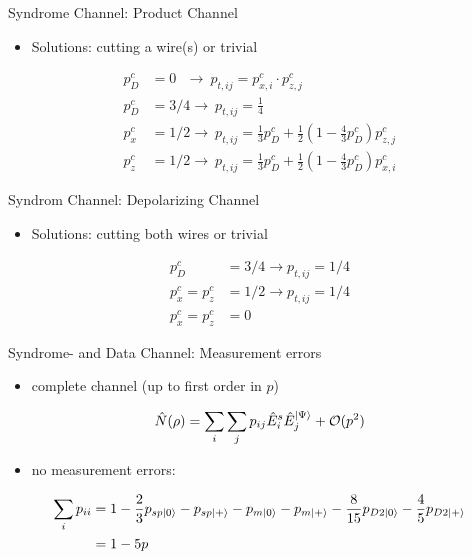 \documentclass{beamer}
\begin{document}
\begin{frame}{Syndrome Channel: Product Channel}

\begin{itemize}
    \item Solutions: cutting a wire(s) or trivial
\end{itemize}
\begin{align*}
    p_D^c &= 0 \ \ \ \rightarrow  \  p_{t,ij} =  p_{x,i}^c \cdot p_{z,j}^c\\
    p_D^c &= 3/4 \rightarrow\   p_{t,ij} = \frac{1}{4} \\
    p_x^c &= 1/2 \rightarrow \  p_{t,ij} =  \frac{1}{3}p_D^c + \frac{1}{2}\left(1-\frac{4}{3}p_D^c\right)p_{z,j}^c\\
    p_z^c &= 1/2 \rightarrow \  p_{t,ij} =  \frac{1}{3}p_D^c + \frac{1}{2}\left(1-\frac{4}{3}p_D^c\right)p_{x,i}^c
\end{align*}

\end{frame}

\begin{frame}{Syndrom Channel: Depolarizing  Channel}
\begin{itemize}
    \item Solutions: cutting both wires or trivial
\end{itemize}
\begin{align*}
    p_D^c &= 3/4 \rightarrow p_{t,ij} = 1/4\\
    p_x^c = p_z^c &= 1/2\rightarrow p_{t,ij} = 1/4\\
    p_x^c = p_z^c &= 0 
\end{align*}

\end{frame}

\begin{frame}{Syndrome- and Data Channel: Measurement errors}
    \begin{itemize}
        \item complete channel (up to first order in $p$)
    \end{itemize}

    \begin{equation*}
         \hat{N}(\rho) = \sum_i \sum_j p_{ij} \hat{E}_i^{s} \hat{E}_j^{\ket{\Psi}} + \mathcal{O}(p^2)
    \end{equation*}
    
    \begin{itemize}
        \item no measurement errors:     
    \end{itemize}
    \begin{align*}
        \sum_i p_{ii} &= 1- \frac{2}{3} p_{sp\ket{0}} -  p_{sp\ket{+}} - p_{m\ket{0}}- p_{m\ket{+}} - \frac{8}{15} p_{D2\ket{0}}- \frac{4}{5} p_{D2\ket{+}}  \\
        &= 1- 5 p 
    \end{align*}


\end{frame}
\end{document}
